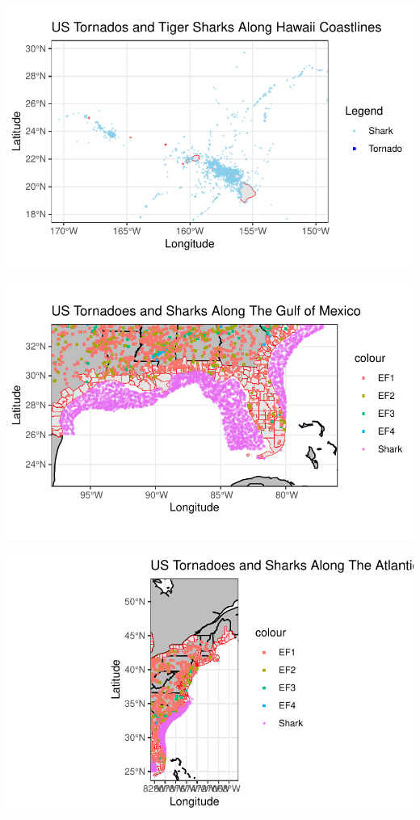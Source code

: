 \documentclass[
  letterpaper,
  DIV=11,
  numbers=noendperiod]{scrreprt}
\begin{document}
\includegraphics{draft-results2_files/figure-pdf/Path of Tornadoes in the US-2.pdf}

\includegraphics{draft-results2_files/figure-pdf/Path of Tornadoes in the US-3.pdf}

\includegraphics{draft-results2_files/figure-pdf/Path of Tornadoes in the US-4.pdf}
\end{document}
